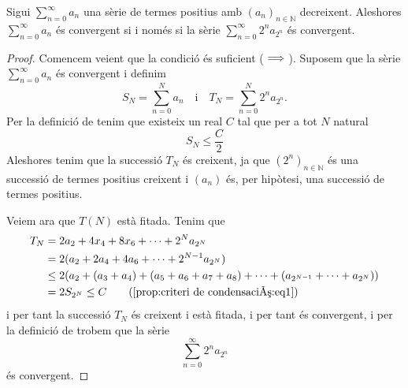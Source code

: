 \documentclass[../../Main.tex]{subfiles}
\begin{document}
	\begin{proposition}
		\label{prop:criteri de condensació}
		Sigui \(\sum_{n=0}^{\infty}a_{n}\) una sèrie de termes positius amb \((a_{n})_{n\in\mathbb{N}}\) decreixent. Aleshores \(\sum_{n=0}^{\infty}a_{n}\) és convergent si i només si la sèrie \(\sum_{n=0}^{\infty}2^{n}a_{2^{n}}\) és convergent.
		\begin{proof}
			Comencem veient que la condició és suficient (\(\implies\)). Suposem que la sèrie \(\sum_{n=0}^{\infty}a_{n}\) és convergent i definim
			\[S_{N}=\sum_{n=0}^{N}a_{n}\quad\text{i}\quad T_{N}=\sum_{n=0}^{N}2^{n}a_{2^{n}}.\]
			Per la definició de  tenim que existeix un real \(C\) tal que per a tot \(N\) natural
			\begin{equation}
				\label{prop:criteri de condensació:eq1}
				S_{N}\leq\frac{C}{2}
			\end{equation}
			Aleshores tenim que la successió \(T_{N}\) és creixent, ja que \((2^{n})_{n\in\mathbb{N}}\) és una successió de termes positius creixent i \((a_{n})\) és, per hipòtesi, una successió de termes positius. %
			
			Veiem ara que \(T(N)\) està fitada. Tenim que
			\begin{align*}
				T_{N}&=2a_{2}+4x_{4}+8x_{6}+\dots+2^{N}a_{2^{N}} \\
				&=2(a_{2}+2a_{4}+4a_{6}+\dots+2^{N-1}a_{2^{N}}) \\
				&\leq2\left(a_{2}+(a_{3}+a_{4})+(a_{5}+a_{6}+a_{7}+a_{8})+\dots+(a_{2^{N-1}}+\dots+a_{2^{N}})\right) \\
				&=2S_{2^{N}}\leq C \tag{\ref{prop:criteri de condensació:eq1}}
			\end{align*}
			i per tant la successió \(T_{N}\) és creixent i està fitada, i per tant és convergent, i per la definició de  trobem que la sèrie
			\[\sum_{n=0}^{\infty}2^{n}a_{2^{n}}\]
			és convergent.
			

\end{proof}
\end{proposition}
\end{document}
